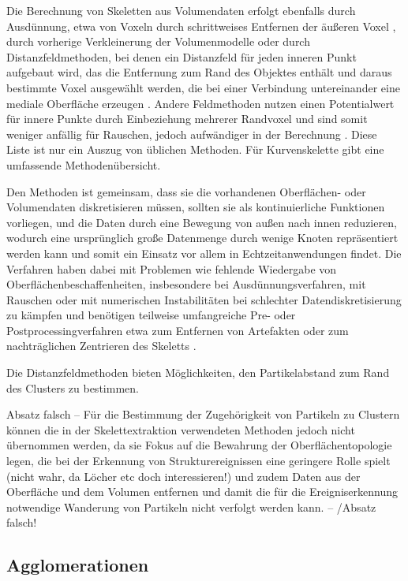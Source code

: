 Die Berechnung von Skeletten aus Volumendaten erfolgt ebenfalls durch Ausdünnung, etwa von Voxeln durch schrittweises Entfernen der äußeren Voxel \cite{ma2002TopologyPreservingReduction}, durch vorherige Verkleinerung der Volumenmodelle \cite{wang2008curveSkeletonExtraction} oder durch Distanzfeldmethoden, bei denen ein Distanzfeld für jeden inneren Punkt aufgebaut wird, das die Entfernung zum Rand des Objektes enthält und daraus bestimmte Voxel ausgewählt werden, die bei einer Verbindung untereinander eine mediale Oberfläche erzeugen \cite{hassouna2005robustCenterlineExtraction}. Andere Feldmethoden nutzen einen Potentialwert für innere Punkte durch Einbeziehung mehrerer Randvoxel und sind somit weniger anfällig für Rauschen, jedoch aufwändiger in der Berechnung \cite{cornea2005hierarchicalCurveSkeletons}. Diese Liste ist nur ein Auszug von üblichen Methoden. Für Kurvenskelette gibt \cite{cornea2007curveSkeletonProperties} eine umfassende Methodenübersicht.

Den Methoden ist gemeinsam, dass sie die vorhandenen Oberflächen- oder Volumendaten diskretisieren müssen, sollten sie als kontinuierliche Funktionen vorliegen, und die Daten durch eine Bewegung von außen nach innen reduzieren, wodurch eine ursprünglich große Datenmenge durch wenige Knoten repräsentiert werden kann und somit ein Einsatz vor allem in Echtzeitanwendungen findet. Die Verfahren haben dabei mit Problemen wie fehlende Wiedergabe von Oberflächenbeschaffenheiten, insbesondere bei Ausdünnungsverfahren, mit Rauschen oder mit numerischen Instabilitäten bei schlechter Datendiskretisierung zu kämpfen und benötigen teilweise umfangreiche Pre- oder Postprocessingverfahren etwa zum Entfernen von Artefakten oder zum nachträglichen Zentrieren des Skeletts \cite{cornea2007curveSkeletonProperties}.

Die Distanzfeldmethoden bieten Möglichkeiten, den Partikelabstand zum Rand des Clusters zu bestimmen.

Absatz falsch --
Für die Bestimmung der Zugehörigkeit von Partikeln zu Clustern können die in der Skelettextraktion verwendeten Methoden jedoch nicht übernommen werden, da sie Fokus auf die Bewahrung der Oberflächentopologie legen, die bei der Erkennung von Strukturereignissen eine geringere Rolle spielt (nicht wahr, da Löcher etc doch interessieren!) und zudem Daten aus der Oberfläche und dem Volumen entfernen und damit die für die Ereigniserkennung notwendige Wanderung von Partikeln nicht verfolgt werden kann.
-- /Absatz falsch!

\subsection*{Agglomerationen}

